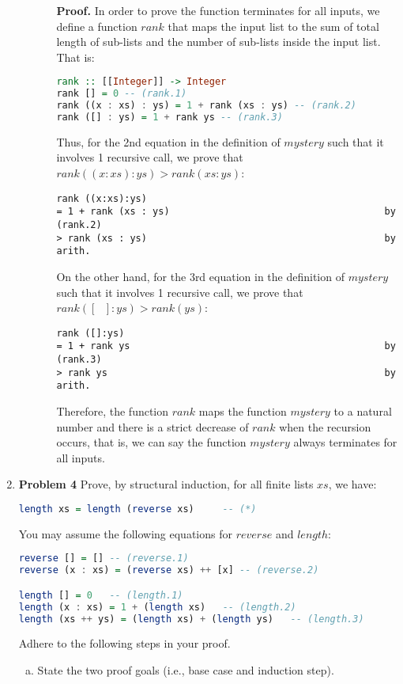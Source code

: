 \documentclass[11pt]{article}
\theoremstyle{definition}
\begin{document}
\begin{enumerate}
\begin{enumerate}[(a)]
\begin{enumerate}[i.]
\textbf{Proof.} In order to prove the function terminates for all inputs, we define a function $rank$ that maps the input
list to the sum of total length of sub-lists and the number of sub-lists inside the input list. That is:
\begin{lstlisting}[language=Haskell]
rank :: [[Integer]] -> Integer
rank [] = 0 -- (rank.1)
rank ((x : xs) : ys) = 1 + rank (xs : ys) -- (rank.2)
rank ([] : ys) = 1 + rank ys -- (rank.3)
\end{lstlisting}   
Thus, for the 2nd equation in the definition of $mystery$ such that it involves 1 recursive call, we prove that $rank ((x:xs):ys) > rank(xs:ys)$:
\begin{verbatim}
rank ((x:xs):ys)
= 1 + rank (xs : ys)                                      by (rank.2)
> rank (xs : ys)                                          by arith.
\end{verbatim}
On the other hand, for the 3rd equation in the definition of $mystery$ such that it involves 1 recursive call, we prove that $rank ([\text{ }]:ys) > rank(ys)$:
\begin{verbatim}
rank ([]:ys)
= 1 + rank ys                                             by (rank.3)
> rank ys                                                 by arith.
\end{verbatim}
Therefore, the function $rank$ maps the function $mystery$ to a natural number and there is a strict decrease of $rank$ when the recursion occurs, that is, we can say the function $mystery$ always terminates for all inputs. 
\end{enumerate}
\end{enumerate}

\item[] \textbf{Problem 4}
Prove, by structural induction, for all finite lists $xs$, we have: 
\begin{lstlisting}[language=Haskell]
length xs = length (reverse xs)		-- (*)
\end{lstlisting}
You may assume the following equations for $reverse$ and $length$:
\begin{lstlisting}[language=Haskell]
reverse [] = [] -- (reverse.1)
reverse (x : xs) = (reverse xs) ++ [x] -- (reverse.2)

length [] = 0	-- (length.1)
length (x : xs) = 1 + (length xs)	-- (length.2)
length (xs ++ ys) = (length xs) + (length ys)	-- (length.3)
\end{lstlisting}
Adhere to the following steps in your proof.
\begin{enumerate}[(a)]
\item State the two proof goals (i.e., base case and induction step).


\end{enumerate}
\end{enumerate}
\end{document}

